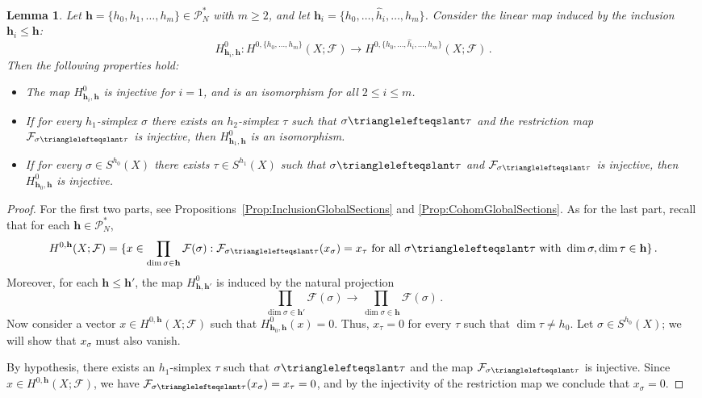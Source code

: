 \documentclass[reqno,12pt]{amsart}
\newcommand{\face}{{\trianglelefteqslant}}
\newcommand{\cF}{{\mathcal F}}
\newcommand{\cP}{\mathcal{P}}
\newcommand{\0}{\mathbf 0}
\newcommand{\h}{\mathbf{h}}
\newtheorem{lemma}[theorem]{Lemma}
\theoremstyle{definition}
\begin{document}
\begin{lemma}\label{Lem:InyectivosIsomorfismos}
    Let $\h=\{h_0,h_1,\dots,h_m\}\in \cP^{*}_N$ with $m\geq 2$, and let $\h_i=\{h_0,\dots,\widehat{h}_i,\dots,h_m\}$. Consider the linear map induced by the inclusion $\h_i\leq \h$:
    \begin{equation}\label{Eq:MorfismoHnhhi}
        H^0_{\h_i,\h}\colon H^{0,\{h_0,\dots,h_m\}}(X;\cF)\longrightarrow H^{0,\{h_0,\dots,\widehat{h}_i,\dots,h_m\}}(X;\cF)\, .
    \end{equation}
    Then the following properties hold:
    \begin{itemize}
        \item The map $H_{\h_i,\h}^0$ is injective for $i=1$, and is an isomorphism for all $2\leq i\leq m$.
        \item If for every $h_1$-simplex $\sigma$ there exists an $h_2$-simplex $\tau$ such that $\sigma\face\tau$ and the restriction map $\cF_{\sigma\face\tau}$ is injective, then $H^0_{\h_1,\h}$ is an isomorphism.
        \item If for every $\sigma\in S^{h_0}(X)$ there exists $\tau\in S^{h_1}(X)$ such that $\sigma\face \tau$ and $\cF_{\sigma\face \tau}$ is injective, then $H^0_{\h_0,\h}$ is injective.
    \end{itemize}
\end{lemma}
\begin{proof} For the first two parts, see Propositions~\ref{Prop:InclusionGlobalSections} and \ref{Prop:CohomGlobalSections}. As for the last part, recall that for each $\h\in \cP^{*}_N$,
 \[
   H^{0,\h}(X;\cF)=\{x\in \prod_{\dim\sigma\in \h}\cF(\sigma) : \cF_{\sigma\face\tau}(x_\sigma)=x_\tau \text{ for all } \sigma\face \tau \text{ with } \dim\sigma,\dim\tau\in \h\}\, .
   \]
 Moreover, for each $\h\leq \h'$, the map $H^{0}_{\h,\h'}$ is induced by the natural projection
   \[
  \prod_{\dim\sigma\in\h'}\cF(\sigma)\longrightarrow \prod_{\dim\sigma\in \h}\cF(\sigma)\, .
  \]
Now consider a vector $x\in H^{0,\h}(X;\cF)$ such that $H^0_{\h_0,\h}(x)=0$. Thus, $x_\tau=0$ for every $\tau$ such that $\dim\tau\neq h_0$. Let $\sigma\in S^{h_0}(X)$; we will show that $x_\sigma$ must also vanish.

By hypothesis, there exists an $h_1$-simplex $\tau$ such that $\sigma\face\tau$ and the map $\cF_{\sigma\face\tau}$ is injective. Since $x\in H^{0,\h}(X;\cF)$, we have $\cF_{\sigma\face\tau}(x_\sigma)=x_\tau=0$, and by the injectivity of the restriction map we conclude that $x_\sigma=0$.
\end{proof}
\end{document}
